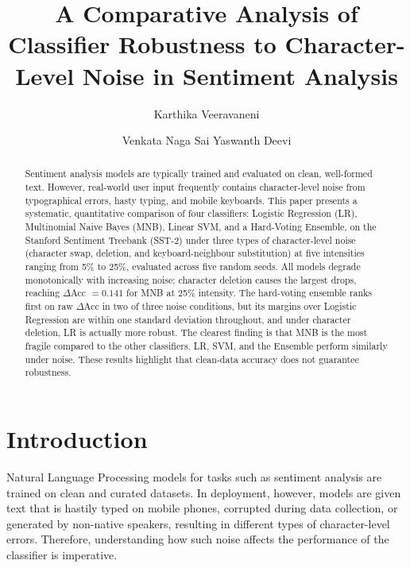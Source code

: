 \documentclass[sigconf]{acmart}
\begin{document}
\title{A Comparative Analysis of Classifier Robustness to Character-Level Noise in Sentiment Analysis}

\author{Karthika Veeravaneni}

\author{Venkata Naga Sai Yaswanth Deevi}

\begin{abstract}
Sentiment analysis models are typically trained and evaluated on clean,
well-formed text. However, real-world user input frequently contains
character-level noise from typographical errors, hasty typing, and mobile
keyboards. This paper presents a systematic, quantitative comparison of four
classifiers: Logistic Regression (LR), Multinomial Naive Bayes (MNB), Linear
SVM, and a Hard-Voting Ensemble, on the Stanford Sentiment Treebank (SST-2)
under three types of character-level noise (character swap, deletion, and
keyboard-neighbour substitution) at five intensities ranging from 5\% to 25\%,
evaluated across five random seeds. All models degrade monotonically with
increasing noise; character deletion causes the largest drops, reaching
$\Delta$Acc $= 0.141$ for MNB at 25\% intensity. The hard-voting ensemble ranks
first on raw $\Delta$Acc in two of three noise conditions, but its margins over
Logistic Regression are within one standard deviation throughout, and under
character deletion, LR is actually more robust. The clearest finding is that
MNB is the most fragile compared to the other classifiers. LR, SVM, and the
Ensemble perform similarly under noise. These results highlight that
clean-data accuracy does not guarantee robustness.
\end{abstract}

\maketitle

\section{Introduction}

Natural Language Processing models for tasks such as sentiment analysis are
trained on clean and curated datasets. In deployment, however, models are given
text that is hastily typed on mobile phones, corrupted during data collection,
or generated by non-native speakers, resulting in different types of
character-level errors. Therefore, understanding how such noise affects the
performance of the classifier is imperative.
\end{document}
